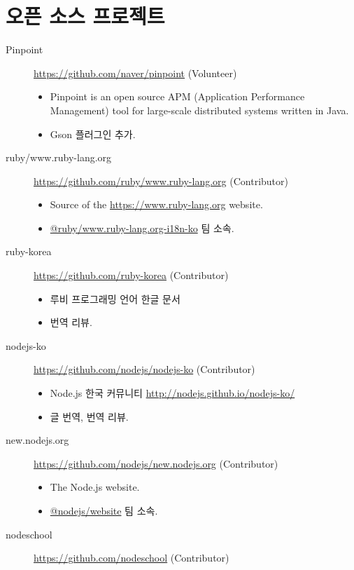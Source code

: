 \documentclass[a4paper,10pt]{article}
\begin{document}
\section{오픈 소스 프로젝트}
\begin{description}
  \item[Pinpoint] \url{https://github.com/naver/pinpoint} (Volunteer)
    \begin{itemize}
      \item Pinpoint is an open source APM (Application Performance Management) tool for large-scale distributed systems written in Java.
      \item Gson 플러그인 추가.
    \end{itemize}
  \item[ruby/www.ruby-lang.org] \url{https://github.com/ruby/www.ruby-lang.org} (Contributor)
    \begin{itemize}
      \item Source of the \url{https://www.ruby-lang.org} website.
      \item \href{https://github.com/orgs/ruby/teams/www-ruby-lang-org-i18n-ko}{@ruby/www.ruby-lang.org-i18n-ko} 팀 소속.
    \end{itemize}
  \item[ruby-korea] \url{https://github.com/ruby-korea} (Contributor)
    \begin{itemize}
      \item 루비 프로그래밍 언어 한글 문서
      \item 번역 리뷰.
    \end{itemize}
  \item[nodejs-ko] \url{https://github.com/nodejs/nodejs-ko} (Contributor)
    \begin{itemize}
      \item Node.js 한국 커뮤니티 \url{http://nodejs.github.io/nodejs-ko/}
      \item 글 번역, 번역 리뷰.
    \end{itemize}
  \item[new.nodejs.org] \url{https://github.com/nodejs/new.nodejs.org} (Contributor)
    \begin{itemize}
      \item The Node.js website.
      \item \href{https://github.com/orgs/nodejs/teams/website}{@nodejs/website} 팀 소속.
    \end{itemize}
  \item[nodeschool] \url{https://github.com/nodeschool} (Contributor)
    \begin{itemize}

\end{itemize}
\end{description}
\end{document}
